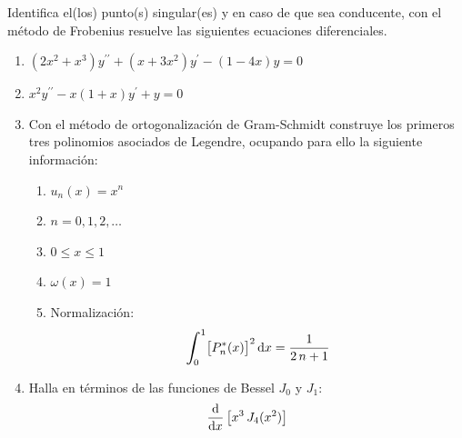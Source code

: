\documentclass[hidelinks,12pt]{article}
\newcommand{\ptilde}[1]{\ensuremath{{#1}^{\prime}}}
\newcommand{\stilde}[1]{\ensuremath{{#1}^{\prime \prime}}}
\def\scaleint#1{\vcenter{\hbox{\scaleto[3ex]{\displaystyle\int}{#1}}}}
\def\bs{\mkern-12mu}
\begin{document}
Identifica el(los) punto(s) singular(es) y en caso de que sea conducente, con el método de Frobenius resuelve las siguientes ecuaciones diferenciales.
\begin{enumerate}[resume]
\item $(2 x^{2} + x^{3}) \stilde{y} + (x + 3 x^{2}) \ptilde{y} - (1 - 4 x) y = 0$
\item $x^{2} \stilde{y} - x (1 + x) \ptilde{y} + y = 0$
\item Con el método de ortogonalización de Gram-Schmidt construye los primeros tres polinomios asociados de Legendre, ocupando para ello la siguiente información:
\begin{enumerate}[label=\alph*)]
\item $u_{n}(x) = x^{n}$
\item $n = 0, 1, 2, \ldots$
\item $0 \leq x \leq 1$
\item $\omega (x) = 1$
\item Normalización:
\begin{align*}
\scaleint{6ex}_{\bs 0}^{1} \big[ P_{n}^{*} (x) \big]^{2} \dd{x} = \dfrac{1}{2 \, n + 1}
\end{align*}
\end{enumerate}
\item Halla en términos de las funciones de Bessel $J_{0}$ y $J_{1}$:
\begin{align*}
    \dv{x} \left[ x^{3} \, J_{4} (x^{2}) \right]
\end{align*}


\end{enumerate}
\end{document}

